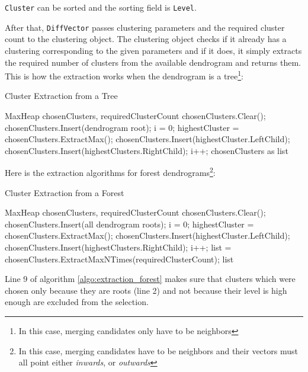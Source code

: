 \verb+Cluster+ can be sorted and the sorting field is \verb+Level+.

After that, \verb+DiffVector+ passes clustering parameters and the required cluster count to the clustering object. The clustering object checks if it already has a clustering corresponding to the given parameters and if it does, it simply extracts the required number of clusters from the available dendrogram and returns them. This is how the extraction works when the dendrogram is a tree\footnote{In this case, merging candidates only have to be neighbors}:

\begin{algorithm}[H]
\caption{Cluster Extraction from a Tree}
\begin{algorithmic}[1]

\Require MaxHeap chosenClusters, requiredClusterCount
\Statex
\State chosenClusters.Clear();
\State chosenClusters.Insert(dendrogram root);
\State i = 0;
	\State highestCluster = chosenClusters.ExtractMax();
    \State chosenClusters.Insert(highestCluster.LeftChild);
    \State chosenClusters.Insert(highestClusters.RightChild);
    \State i++;
\EndWhile
\Statex
\Return chosenClusters as list
\end{algorithmic}
\end{algorithm}

Here is the extraction algorithms for forest dendrograms\footnote{In this case, merging candidates have to be neighbors and their vectors must all point either {\it inwards}, or {\it outwards}}:

\begin{algorithm}[H]
\caption{Cluster Extraction from a Forest}
\label{algo:extraction_forest}
\begin{algorithmic}[1]

\Require MaxHeap chosenClusters, requiredClusterCount
\Statex
\State chosenClusters.Clear();
\State chosenClusters.Insert(all dendrogram roots);
\State i = 0;
	\State highestCluster = chosenClusters.ExtractMax();
    \State chosenClusters.Insert(highestCluster.LeftChild);
    \State chosenClusters.Insert(highestClusters.RightChild);
    \State i++;
\EndWhile
\State list = chosenClusters.ExtractMaxNTimes(requiredClusterCount);
\Statex
\Return list
\end{algorithmic}
\end{algorithm}

Line 9 of algorithm \ref{algo:extraction_forest} makes sure that clusters which were chosen only because they are roots (line 2) and not because their level is high enough are excluded from the selection.


